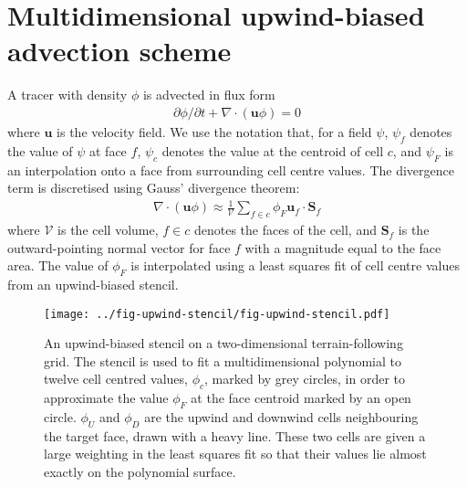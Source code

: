 \documentclass{article}
\begin{document}
\section{Multidimensional upwind-biased advection scheme}
A tracer with density $\phi$ is advected in flux form
\begin{align}
\partial \phi / \partial t + \nabla \cdot \left( \mathbf{u} \phi \right) = 0
\end{align}
where $\mathbf{u}$ is the velocity field.  We use the notation that, for a field $\psi$, $\psi_f$ denotes the value of $\psi$ at face $f$, $\psi_c$ denotes the value at the centroid of cell $c$, and $\psi_F$ is an interpolation onto a face from surrounding cell centre values.  The divergence term is discretised using Gauss' divergence theorem:
\begin{align}
	\nabla \cdot \left( \mathbf{u} \phi \right) \approx \frac{1}{\mathcal{V}} \sum_{f \in c} \phi_F \mathbf{u}_f \cdot \mathbf{S}_f
\end{align}
where $\mathcal{V}$ is the cell volume, $f \in c$ denotes the faces of the cell, and $\mathbf{S}_f$ is the outward-pointing normal vector for face $f$ with a magnitude equal to the face area.
The value of $\phi_F$ is interpolated using a least squares fit of cell centre values from an upwind-biased stencil.
\begin{figure}
	\centering
	\texttt{[image: ../fig-upwind-stencil/fig-upwind-stencil.pdf]}
	\caption{An upwind-biased stencil on a two-dimensional terrain-following grid.  The stencil is used to fit a multidimensional polynomial to twelve cell centred values, $\phi_c$, marked by grey circles, in order to approximate the value $\phi_F$ at the face centroid marked by an open circle.  $\phi_U$ and $\phi_D$ are the upwind and downwind cells neighbouring the target face, drawn with a heavy line.  These two cells are given a large weighting in the least squares fit so that their values lie almost exactly on the polynomial surface.}
	\label{fig:upwind-stencil}
\end{figure}
\end{document}

